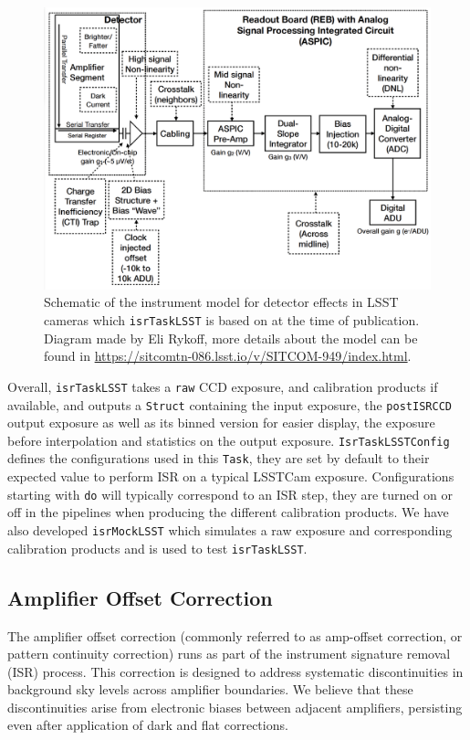 \begin{figure}[h!]
    \centering
\includegraphics[scale=0.25]{isr_plots/instrumentmodel_isr.png}
    \caption{Schematic of the instrument model for detector effects in LSST cameras which \texttt{isrTaskLSST} is based on at the time of publication. Diagram made by Eli Rykoff, more details about the model can be found in \url{https://sitcomtn-086.lsst.io/v/SITCOM-949/index.html}.}
    \label{fig:isr_model}
\end{figure}


Overall, \texttt{isrTaskLSST} takes a \texttt{raw} CCD exposure, and calibration products if available, and outputs a \texttt{Struct} containing the input exposure, the \texttt{postISRCCD} output exposure as well as its binned version for easier display, the exposure before interpolation and statistics on the output exposure.
\texttt{IsrTaskLSSTConfig} defines the configurations used in this \texttt{Task}, they are set by default to their expected value to perform ISR on a typical LSSTCam exposure. Configurations starting with \texttt{do} will typically correspond to an ISR step, they are turned on or off in the pipelines when producing the different calibration products.
We have also developed \texttt{isrMockLSST} which simulates a raw exposure and corresponding calibration products and is used to test \texttt{isrTaskLSST}.


\subsection{Amplifier Offset Correction}
\label{sec:isr:ampoffset}
The amplifier offset correction (commonly referred to as amp-offset correction, or pattern continuity correction) runs as part of the instrument signature removal (ISR) process.
This correction is designed to address systematic discontinuities in background sky levels across amplifier boundaries.
We believe that these discontinuities arise from electronic biases between adjacent amplifiers, persisting even after application of dark and flat corrections.

